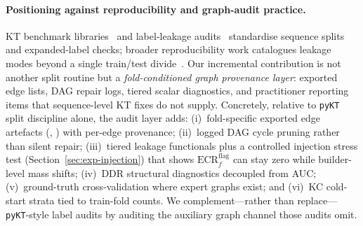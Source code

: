 \documentclass[preprint,10pt,doubleblind]{elsarticle}
\newcommand{\DDR}{\textsc{DDR}}
\begin{document}
\paragraph{Positioning against reproducibility and graph-audit practice.}
KT benchmark libraries~\cite{liu2022pykt,abdelrahman2023kt_survey} and
label-leakage audits~\cite{badran2024labelleakage} standardise sequence splits
and expanded-label checks; broader reproducibility work catalogues leakage
modes beyond a single train/test divide~\cite{kaufman2012leakage,kapoor2023leakage}.
Our incremental contribution is not another split routine but a
\emph{fold-conditioned graph provenance layer}: exported edge lists, DAG repair
logs, tiered scalar diagnostics, and practitioner reporting items that
sequence-level KT fixes do not supply. Concretely, relative to
\texttt{pyKT}~\cite{liu2022pykt} split discipline alone, the audit layer adds:
(i)~fold-specific exported edge artefacts (,
) with per-edge provenance;
(ii)~logged DAG cycle pruning rather than silent repair;
(iii)~tiered leakage functionals plus a controlled injection stress test
(Section~\ref{sec:exp-injection}) that shows $\mathrm{ECR}^{\mathrm{flag}}_f$
can stay zero while builder-level mass shifts;
(iv)~\DDR{} structural diagnostics decoupled from AUC;
(v)~ground-truth cross-validation where expert graphs exist; and
(vi)~KC cold-start strata tied to train-fold counts. We complement---rather
than replace---\texttt{pyKT}-style label audits by auditing the auxiliary graph
channel those audits omit.
\end{document}
